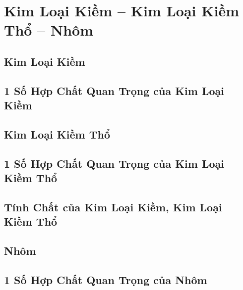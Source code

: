 \documentclass{article}
\numberwithin{equation}{section}
\begin{document}

\section{Kim Loại Kiềm -- Kim Loại Kiềm Thổ -- Nhôm}

\subsection{Kim Loại Kiềm}


\subsection{1 Số Hợp Chất Quan Trọng của Kim Loại Kiềm}


\subsection{Kim Loại Kiềm Thổ}


\subsection{1 Số Hợp Chất Quan Trọng của Kim Loại Kiềm Thổ}


\subsection{Tính Chất của Kim Loại Kiềm, Kim Loại Kiềm Thổ}


\subsection{Nhôm}


\subsection{1 Số Hợp Chất Quan Trọng của Nhôm}
\end{document}
